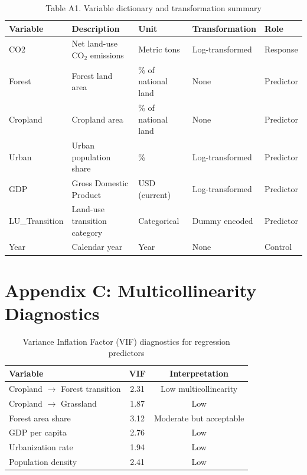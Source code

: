 \documentclass[10pt,letterpaper]{article}
\begin{document}
\begin{table}[H]
	\centering
	\caption{Table A1. Variable dictionary and transformation summary}
	\begin{tabular}{lllll}
		\hline
		\textbf{Variable} & \textbf{Description} & \textbf{Unit} & \textbf{Transformation} & \textbf{Role} \\
		\hline
		CO2 & Net land-use CO$_2$ emissions & Metric tons & Log-transformed & Response \\
		Forest & Forest land area & \% of national land & None & Predictor \\
		Cropland & Cropland area & \% of national land & None & Predictor \\
		Urban & Urban population share & \% & Log-transformed & Predictor \\
		GDP & Gross Domestic Product & USD (current) & Log-transformed & Predictor \\
		LU\_Transition & Land-use transition category & Categorical & Dummy encoded & Predictor \\
		Year & Calendar year & Year & None & Control \\
		\hline
	\end{tabular}
\end{table}

\section*{Appendix C: Multicollinearity Diagnostics}
\label{tab:VIF}
\begin{table}[H]
	\centering
	\caption{Variance Inflation Factor (VIF) diagnostics for regression predictors}
	\begin{tabular}{lcc}
		\hline
		\textbf{Variable} & \textbf{VIF} & \textbf{Interpretation} \\
		\hline
		Cropland $\rightarrow$ Forest transition & 2.31 & Low multicollinearity \\
		Cropland $\rightarrow$ Grassland & 1.87 & Low \\
		Forest area share & 3.12 & Moderate but acceptable \\
		GDP per capita & 2.76 & Low \\
		Urbanization rate & 1.94 & Low \\
		Population density & 2.41 & Low \\
		\hline
	\end{tabular}
\end{table}
\end{document}
